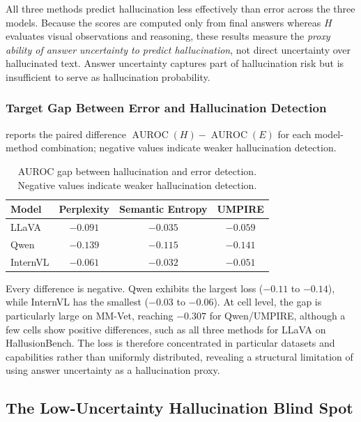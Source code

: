 All three methods predict hallucination less effectively than error across the three models. Because the scores are computed only from final answers whereas $H$ evaluates visual observations and reasoning, these results measure the \emph{proxy ability of answer uncertainty to predict hallucination}, not direct uncertainty over hallucinated text. Answer uncertainty captures part of hallucination risk but is insufficient to serve as hallucination probability.

\subsubsection{Target Gap Between Error and Hallucination Detection}

 reports the paired difference $\operatorname{AUROC}(H)-\operatorname{AUROC}(E)$ for each model-method combination; negative values indicate weaker hallucination detection.

\begin{table}[H]
\centering
\caption{AUROC gap between hallucination and error detection. Negative values indicate weaker hallucination detection.}
\label{tab:target_gap}
\small
\setlength{\tabcolsep}{12pt}
\renewcommand{\arraystretch}{1.18}
\begin{tabular}{@{}lccc@{}}
\toprule
\textbf{Model} & \textbf{Perplexity} & \textbf{Semantic Entropy} & \textbf{UMPIRE} \\
\midrule
LLaVA & $-0.091$ & $-0.035$ & $-0.059$ \\
\rowcolor{gray!12} Qwen & $-0.139$ & $-0.115$ & $-0.141$ \\
InternVL & $-0.061$ & $-0.032$ & $-0.051$ \\
\bottomrule
\end{tabular}
\end{table}

Every difference is negative. Qwen exhibits the largest loss ($-0.11$ to $-0.14$), while InternVL has the smallest ($-0.03$ to $-0.06$). At cell level, the gap is particularly large on MM-Vet, reaching $-0.307$ for Qwen/UMPIRE, although a few cells show positive differences, such as all three methods for LLaVA on HallusionBench. The loss is therefore concentrated in particular datasets and capabilities rather than uniformly distributed, revealing a structural limitation of using answer uncertainty as a hallucination proxy.

\subsection{The Low-Uncertainty Hallucination Blind Spot}
\label{subsec:luh_blind_spot}

